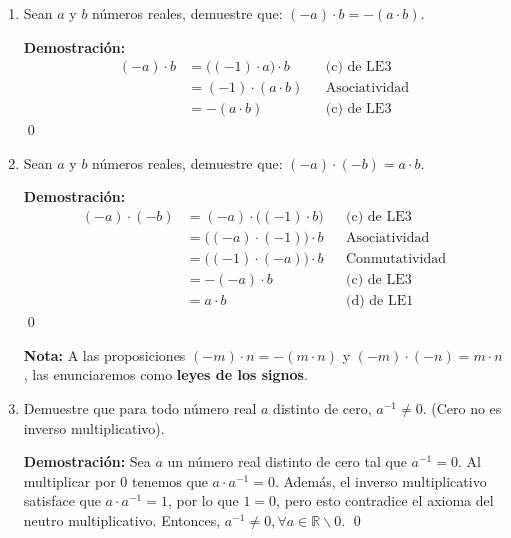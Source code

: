 \documentclass[11pt]{article}
\newcommand{\R}{\mathbb{R}}
\begin{document}
\begin{enumerate}[label=\alph*)]
        \item Sean $a$ y $b$ números reales, demuestre que: $ (-a) \cdot b = -(a \cdot b) $.
        
        \textbf{Demostración:} \begin{align*}
        (-a) \cdot b &= \bigl( \left(-1 \right) \cdot a \bigr) \cdot b && \text{(c) de LE3}\\
        &= (-1) \cdot (a \cdot b) && \text{Asociatividad}\\
        &= -(a \cdot b) && \text{(c) de LE3}
        \end{align*} \qed

        \item Sean $a$ y $b$ números reales, demuestre que: $ (-a) \cdot (-b) = a \cdot b $. 
        
        \textbf{Demostración:} \begin{align*}
            (-a) \cdot (-b) &= (-a) \cdot \bigl( (-1) \cdot b \bigr) && \text{(c) de LE3}\\
            &= \bigl( (-a) \cdot (-1) \bigr) \cdot b && \text{Asociatividad}\\
            &= \bigl( (-1) \cdot (-a) \bigr) \cdot b && \text{Conmutatividad}\\
            &= -(-a) \cdot b && \text{(c) de LE3}\\
            &= a \cdot b && \text{(d) de LE1}
        \end{align*} \qed

        \textbf{Nota:} A las proposiciones $ (-m) \cdot n = -(m \cdot n) $ y $ (-m) \cdot (-n) = m \cdot n $, las enunciaremos como \textbf{leyes de los signos}.
        \item Demuestre que para todo número real $a$ distinto de cero, $a^{-1}\neq 0$. (Cero no es inverso multiplicativo).
        
        \textbf{Demostración:} Sea $a$ un número real distinto de cero tal que $a^{-1}=0$. Al multiplicar por $0$ tenemos que $a\cdot a^{-1}=0$. Además, el inverso multiplicativo satisface que $a\cdot a^{-1}=1$, por lo que $1=0$, pero esto contradice el axioma del neutro multiplicativo. Entonces, $a^{-1}\neq 0, \forall a\in \R\backslash {0}$. \qed


\end{enumerate}
\end{document}
